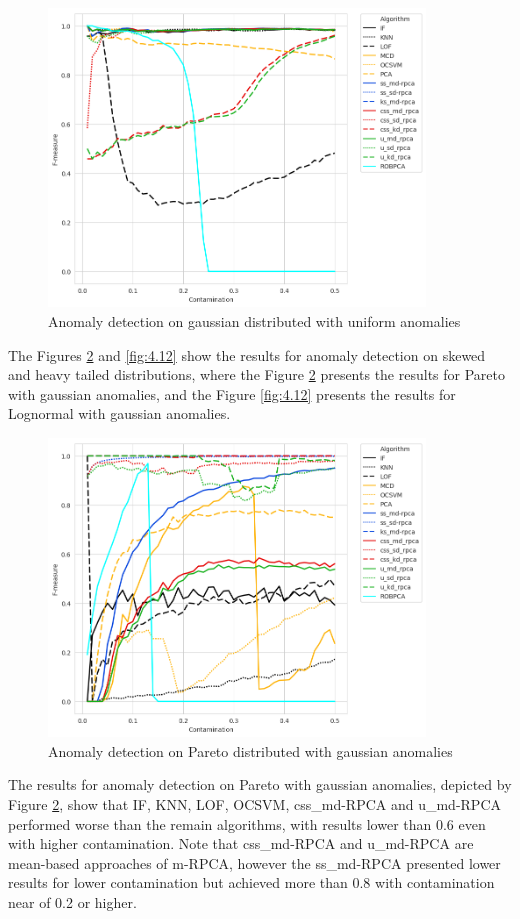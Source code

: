 \begin{figure}[h!]
	\centering
	\includegraphics[width=10cm]{figures/ch4/gaussian_f1_contamination.png}
	\caption{Anomaly detection on gaussian distributed with uniform anomalies}
	\label{fig:4.10}
\end{figure}

The Figures \ref{fig:4.11} and \ref{fig:4.12} show the results for anomaly detection on skewed and heavy tailed distributions, where the Figure \ref{fig:4.11} presents the results for Pareto with gaussian anomalies, and the Figure \ref{fig:4.12} presents the results for Lognormal with gaussian anomalies.

\begin{figure}[h!]
	\centering
	\includegraphics[width=10cm]{figures/ch4/pareto_f1_contamination.png}
	\caption{Anomaly detection on Pareto distributed with gaussian anomalies}
	\label{fig:4.11}
\end{figure}

The results for anomaly detection on Pareto with gaussian anomalies, depicted by Figure \ref{fig:4.11}, show that IF, KNN, LOF, OCSVM, css\_md-RPCA and u\_md-RPCA performed worse than the remain algorithms, with results lower than 0.6 even with higher contamination. Note that css\_md-RPCA and u\_md-RPCA are mean-based approaches of m-RPCA, however the ss\_md-RPCA presented lower results for lower contamination but achieved more than 0.8 with contamination near of 0.2 or higher.

